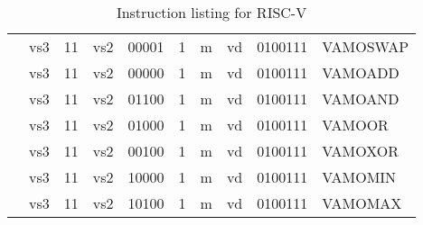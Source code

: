 \begin{table}[p]
\begin{small}
\begin{center}
\begin{tabular}{p{0in}p{0.4in}p{0.1in}p{0.3in}p{0.5in}p{0.5in}p{0.1in}p{0.3in}p{0.5in}p{0.7in}l}
&
\multicolumn{2}{|c|}{vs3} &
\multicolumn{1}{c|}{11} &
\multicolumn{1}{c|}{vs2} &
\multicolumn{1}{c|}{00001} &
\multicolumn{1}{c|}{1} &
\multicolumn{1}{c|}{m} &
\multicolumn{1}{c|}{vd} &
\multicolumn{1}{c|}{0100111} & VAMOSWAP \\
\cline{2-10}
  

&
\multicolumn{2}{|c|}{vs3} &
\multicolumn{1}{c|}{11} &
\multicolumn{1}{c|}{vs2} &
\multicolumn{1}{c|}{00000} &
\multicolumn{1}{c|}{1} &
\multicolumn{1}{c|}{m} &
\multicolumn{1}{c|}{vd} &
\multicolumn{1}{c|}{0100111} & VAMOADD \\
\cline{2-10}
  

&
\multicolumn{2}{|c|}{vs3} &
\multicolumn{1}{c|}{11} &
\multicolumn{1}{c|}{vs2} &
\multicolumn{1}{c|}{01100} &
\multicolumn{1}{c|}{1} &
\multicolumn{1}{c|}{m} &
\multicolumn{1}{c|}{vd} &
\multicolumn{1}{c|}{0100111} & VAMOAND \\
\cline{2-10}
  

&
\multicolumn{2}{|c|}{vs3} &
\multicolumn{1}{c|}{11} &
\multicolumn{1}{c|}{vs2} &
\multicolumn{1}{c|}{01000} &
\multicolumn{1}{c|}{1} &
\multicolumn{1}{c|}{m} &
\multicolumn{1}{c|}{vd} &
\multicolumn{1}{c|}{0100111} & VAMOOR \\
\cline{2-10}
  

&
\multicolumn{2}{|c|}{vs3} &
\multicolumn{1}{c|}{11} &
\multicolumn{1}{c|}{vs2} &
\multicolumn{1}{c|}{00100} &
\multicolumn{1}{c|}{1} &
\multicolumn{1}{c|}{m} &
\multicolumn{1}{c|}{vd} &
\multicolumn{1}{c|}{0100111} & VAMOXOR \\
\cline{2-10}
  

&
\multicolumn{2}{|c|}{vs3} &
\multicolumn{1}{c|}{11} &
\multicolumn{1}{c|}{vs2} &
\multicolumn{1}{c|}{10000} &
\multicolumn{1}{c|}{1} &
\multicolumn{1}{c|}{m} &
\multicolumn{1}{c|}{vd} &
\multicolumn{1}{c|}{0100111} & VAMOMIN \\
\cline{2-10}
  

&
\multicolumn{2}{|c|}{vs3} &
\multicolumn{1}{c|}{11} &
\multicolumn{1}{c|}{vs2} &
\multicolumn{1}{c|}{10100} &
\multicolumn{1}{c|}{1} &
\multicolumn{1}{c|}{m} &
\multicolumn{1}{c|}{vd} &
\multicolumn{1}{c|}{0100111} & VAMOMAX \\
\cline{2-10}
  

\end{tabular}
\end{center}
\end{small}
\caption{Instruction listing for RISC-V}
\end{table}
  

